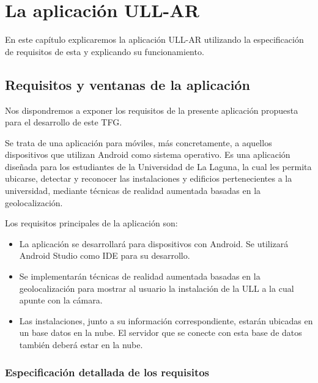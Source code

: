 
%
%
%


\chapter{La aplicación ULL-AR} \label{chap:LaAplicacion} 

En este capítulo explicaremos la aplicación ULL-AR utilizando la especificación de requisitos de esta y explicando su funcionamiento.

\section{Requisitos y ventanas de la aplicación} %

Nos dispondremos a exponer los requisitos de la presente aplicación propuesta para el desarrollo de este TFG.

Se trata de una aplicación para móviles, más concretamente, a aquellos dispositivos que utilizan Android como sistema operativo. Es una aplicación diseñada para los estudiantes de la Universidad de La Laguna, la cual les permita ubicarse, detectar y reconocer las instalaciones y edificios pertenecientes a la universidad, mediante técnicas de realidad aumentada basadas en la geolocalización.

Los requisitos principales de la aplicación son:
\begin{itemize}
    \item La aplicación se desarrollará para dispositivos con Android. Se utilizará Android Studio como IDE para su desarrollo.
    \item Se implementarán técnicas de realidad aumentada basadas en la geolocalización para mostrar al usuario la instalación de la ULL a la cual apunte con la cámara.
    \item Las instalaciones, junto a su información correspondiente, estarán ubicadas en un base datos en la nube. El servidor que se conecte con esta base de datos también deberá estar en la nube.
\end{itemize}

\subsection{Especificación detallada de los requisitos} 

